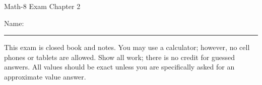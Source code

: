 \documentclass[letterpaper,12pt,fleqn]{article}
\begin{document}
\begin{center}
\Large Math-8 Exam Chapter 2
\end{center}

\vspace{0.5in}

Name: \rule{4in}{1pt}

\vspace{0.5in}

This exam is closed book and notes. You may use a calculator; however, no cell
phones or tablets are allowed. Show all work; there is no credit for guessed
answers. All values should be exact unless you are specifically asked for an
approximate value answer.

\vspace{0.5in}

\newcommand{\fillin}{\rule{3in}{1pt}}
\end{document}
